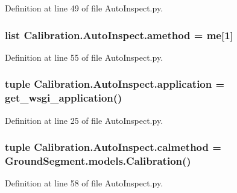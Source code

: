 Definition at line 49 of file Auto\+Inspect.\+py.

\hypertarget{namespace_calibration_1_1_auto_inspect_ae31c8304ffa191d79596a071c8d696c5}{}
\subsubsection[{amethod}]{\setlength{\rightskip}{0pt plus 5cm}list Calibration.\+Auto\+Inspect.\+amethod = me\mbox{[}1\mbox{]}}\label{namespace_calibration_1_1_auto_inspect_ae31c8304ffa191d79596a071c8d696c5}


Definition at line 55 of file Auto\+Inspect.\+py.

\hypertarget{namespace_calibration_1_1_auto_inspect_ae00a1e9313d00bdbb0b4e2c7cb3b363b}{}
\subsubsection[{application}]{\setlength{\rightskip}{0pt plus 5cm}tuple Calibration.\+Auto\+Inspect.\+application = get\+\_\+wsgi\+\_\+application()}\label{namespace_calibration_1_1_auto_inspect_ae00a1e9313d00bdbb0b4e2c7cb3b363b}


Definition at line 25 of file Auto\+Inspect.\+py.

\hypertarget{namespace_calibration_1_1_auto_inspect_acd12afb52c4a138c629f23aa79874db9}{}
\subsubsection[{calmethod}]{\setlength{\rightskip}{0pt plus 5cm}tuple Calibration.\+Auto\+Inspect.\+calmethod = {\bf Ground\+Segment.\+models.\+Calibration}()}\label{namespace_calibration_1_1_auto_inspect_acd12afb52c4a138c629f23aa79874db9}


Definition at line 58 of file Auto\+Inspect.\+py.

\hypertarget{namespace_calibration_1_1_auto_inspect_ab0e7aff2928c6e30e46fe2b763c20140}{}
